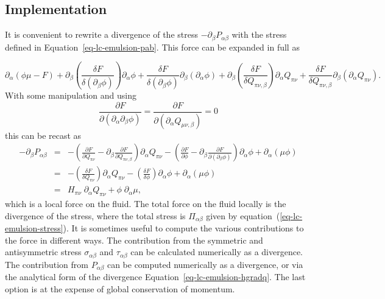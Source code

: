 \subsection{Implementation}

It is convenient \cite{sulaiman2006} to rewrite a divergence of the
stress  $-\partial_\beta P_{\alpha\beta}$ with the stress defined in
Equation~\ref{eq-lc-emulsion-pab}. This force can be expanded in full as

\begin{equation}
\partial_{\alpha}\left(\phi\mu - F\right)
+\partial_{\beta} \left(\frac{\delta F}{\delta \left(\partial_{\beta}\phi\right)}\right)\partial_{\alpha}\phi
+\frac{\delta F}{\delta \left(\partial_{\beta}\phi\right)}\partial_{\beta}\left(\partial_{\alpha}\phi\right)
+\partial_{\beta}\left(\frac{\delta F}{\delta Q_{\pi\nu,\beta}}\right)
 \partial_{\alpha} Q_{\pi\nu}
+\frac{\delta F}{\delta Q_{\pi\nu,\beta}} \partial_{\beta}\left(\partial_{\alpha} Q_{\pi\nu}\right).
\nonumber
\end{equation}
With some manipulation and using $$\frac{\partial F}{\partial (\partial_\alpha\partial_\beta\phi)} = \frac{\partial F}{\partial (\partial_\alpha Q_{\mu\nu,\beta})}=0$$
this can be recast as 
\begin{eqnarray}
-\partial_\beta P_{\alpha\beta} &=& -\left( \frac{\partial F}{\partial Q_{\pi\nu}} 
       - \partial_{\beta}\frac{\partial F}{\partial Q_{\pi\nu,\beta}}
 \right) \partial_{\alpha}Q_{\pi\nu}
- \left(\frac{\partial F}{\partial\phi} 
- \partial_{\beta} \frac{\partial F}{\partial \left(\partial_{\beta}\phi\right)}\right)\partial_{\alpha}\phi + \partial_{\alpha}\left(\mu\phi\right)\nonumber\\
&=& -\left(\frac{\delta F}{\delta Q_{\pi\nu}}\right) \partial_{\alpha}Q_{\pi\nu} - \left(\frac{\delta F}{\delta \phi}\right) \partial_{\alpha} \phi + \partial_{\alpha}\left(\mu\phi\right)\nonumber\\ 
&=& H_{\pi\nu}\; \partial_{\alpha} Q_{\pi\nu} + \phi \;\partial_{\alpha}\mu,
\label{eq-lc-emulsion-hgradq}
\end{eqnarray}
which is a local force on the fluid.
The total force on the fluid locally is the divergence of the stress,
where the total stress is $\Pi_{\alpha\beta}$
given by equation~(\ref{eq-lc-emulsion-stress}).
It is sometimes useful to compute the various contributions to the
force in different ways. The contribution from the symmetric and
antisymmetric stress $\sigma_{\alpha\beta}$ and  $\tau_{\alpha\beta}$
can be calculated numerically as a divergence. The contribution from
$P_{\alpha\beta}$ can be computed numerically as a divergence, or via the
analytical form of the divergence Equation~\ref{eq-lc-emulsion-hgradq}.
The  last option is
at the expense of global conservation of momentum.


\vfill
\pagebreak
